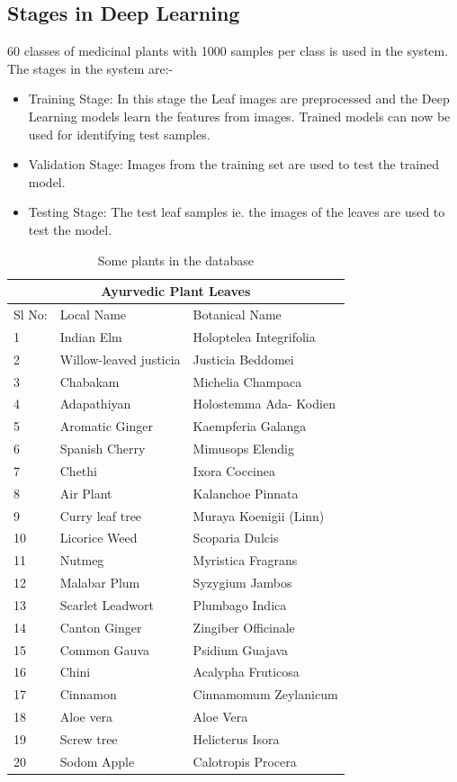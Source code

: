 \subsection{Stages in Deep Learning }
60 classes of medicinal plants with 1000 samples per class is used in the system.
The stages in the system are:- \\
\begin{itemize}
    \item {Training Stage:}
       In this stage the Leaf images are preprocessed and the Deep Learning models learn the features from images. 
       Trained models can now be used for identifying test samples.
    \item {Validation Stage:}
       Images from the training set are used to test the trained model.
    \item{Testing Stage:}
       The test leaf samples ie. the images of the leaves are used to test the model. 
\end{itemize}
\begin{table}
\begin{center}
\begin{tabular}{ |p{1.5cm}|p{5cm}|p{5cm}| }
 \hline
 \multicolumn{3}{|c|}{Ayurvedic Plant Leaves} \\
 \hline
 Sl No: &Local Name &Botanical Name\\
 \hline
 1   & Indian Elm    &Holoptelea Integrifolia\\
 2   & Willow-leaved justicia    &Justicia Beddomei\\
 3   & Chabakam    &Michelia Champaca\\
 4   & Adapathiyan    &Holostemma Ada- Kodien\\
 5   &Aromatic Ginger  &Kaempferia Galanga\\
 6   & Spanish Cherry   &Mimusops Elendig\\
 7   & Chethi  &Ixora Coccinea\\
 8   & Air Plant  &Kalanchoe Pinnata\\
 9   & Curry leaf tree   &Muraya Koenigii (Linn)\\
 10  & Licorice Weed   &Scoparia Dulcis\\
 11  & Nutmeg    &Myristica Fragrans\\
 12  & Malabar Plum   &Syzygium Jambos\\
 13  & Scarlet Leadwort  &Plumbago Indica\\
 14  & Canton Ginger  &Zingiber Officinale\\
 15  & Common Gauva &Psidium Guajava\\
 16  & Chini    &Acalypha Fruticosa\\
 17  & Cinnamon    &Cinnamomum Zeylanicum\\
 18  & Aloe vera   &Aloe Vera\\
 19  & Screw tree    &Helicterus Isora\\
 20  & Sodom Apple    &Calotropis Procera\\

 \hline
\end{tabular}
\end{center}
\caption{Some plants in the database}
\end{table}
\pagebreak

